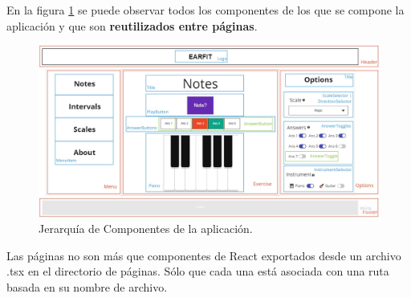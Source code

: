 \documentclass[12pt,twoside,titlepage]{report}
\begin{document}
En la figura \ref{fig:JerarquiaComponentes} se puede observar todos los componentes de los que se compone la aplicación y que son \textbf{reutilizados entre páginas}.

\begin{figure}[H]
    \centering
    \includegraphics[width=\textwidth]{Detalles de Implementación/JerarquíaComponentes}
    \caption{Jerarquía de Componentes de la aplicación.}
    \label{fig:JerarquiaComponentes}
\end{figure}

Las páginas no son más que componentes de React exportados desde un archivo .tsx en el directorio de páginas. Sólo que cada una está asociada con una ruta basada en su nombre de archivo.

\end{document}
